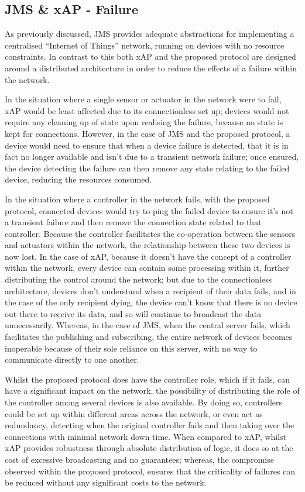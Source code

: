 \subsection{JMS \& xAP - Failure} %
\label{sub:jms_failure}
As previously discussed, JMS provides adequate abstractions for implementing a centralised ``Internet of Things'' network, running on devices with no resource constraints. In contrast to this both xAP and the proposed protocol are designed around a distributed architecture in order to reduce the effects of a failure within the network.

In the situation where a single sensor or actuator in the network were to fail, xAP would be least affected due to its connectionless set up; devices would not require any cleaning up of state upon realising the failure, because no state is kept for connections. However, in the case of JMS and the proposed protocol, a device would need to ensure that when a device failure is detected, that it is in fact no longer available and isn't due to a transient network failure; once ensured, the device detecting the failure can then remove any state relating to the failed device, reducing the resources consumed.

In the situation where a controller in the network fails, with the proposed protocol, connected devices would try to ping the failed device to ensure it's not a transient failure and then remove the connection state related to that controller. Because the controller facilitates the co-operation between the sensors and actuators within the network, the relationship between these two devices is now lost. In the case of xAP, because it doesn't have the concept of a controller within the network, every device can contain some processing within it, further distributing the control around the network; but due to the connectionless architecture, devices don't understand when a recipient of their data fails, and in the case of the only recipient dying, the device can't know that there is no device out there to receive its data, and so will continue to broadcast the data unnecessarily. Whereas, in the case of JMS, when the central server fails, which facilitates the publishing and subscribing, the entire network of devices becomes inoperable because of their sole reliance on this server, with no way to communicate directly to one another.

Whilst the proposed protocol does have the controller role, which if it fails, can have a significant impact on the network, the possibility of distributing the role of the controller among several devices is also available. By doing so, controllers could be set up within different areas across the network, or even act as redundancy, detecting when the original controller fails and then taking over the connections with minimal network down time. When compared to xAP, whilst xAP provides robustness through absolute distribution of logic, it does so at the cost of excessive broadcasting and no guarantees; whereas, the compromise observed within the proposed protocol, ensures that the criticality of failures can be reduced without any significant costs to the network. 



